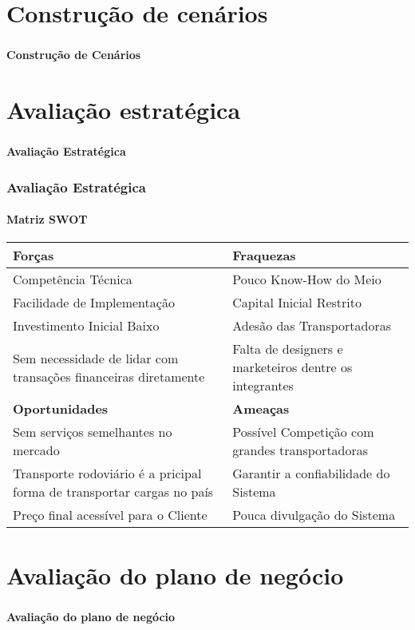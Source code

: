 \documentclass{beamer}
\begin{document}
\section{Construção de cenários}
\begin{frame}
  \frametitle{}
  \framesubtitle{}

  \begin{center}
    {\huge\textbf{Construção de Cenários}}
  \end{center}
\end{frame}

\section{Avaliação estratégica}
\begin{frame}
  \frametitle{}
  \framesubtitle{}

  \begin{center}
    {\huge\textbf{Avaliação Estratégica}}
  \end{center}
\end{frame}

\begin{frame}
  \frametitle{Avaliação Estratégica}
  \framesubtitle{Matriz SWOT}
  \begin{tabular}{|p{5.0cm}|p{5.0cm}|}
  \hline
   \textbf{Forças} & \textbf{Fraquezas}\\ \hline
    Competência Técnica & Pouco Know-How do Meio \\ \hline
   Facilidade de Implementação & Capital Inicial Restrito \\ \hline
   Investimento Inicial Baixo & Adesão das Transportadoras\\ \hline
   Sem necessidade de lidar com transações financeiras diretamente &  Falta de designers e marketeiros dentre os integrantes \\ \hline
    \textbf{Oportunidades} & \textbf{Ameaças}\\ \hline
Sem serviços semelhantes no mercado & Possível Competição com grandes transportadoras\\ \hline
Transporte rodoviário é a pricipal  forma de transportar cargas no país & Garantir a confiabilidade do Sistema \\   \hline
   Preço final acessível para o Cliente & Pouca divulgação do Sistema\\ \hline
  \end{tabular}
\end{frame}
\section{Avaliação do plano de negócio}
\begin{frame}
  \frametitle{}
  \framesubtitle{}

  \begin{center}
    {\huge\textbf{Avaliação do plano de negócio}}
  \end{center}
\end{frame}
\end{document}
